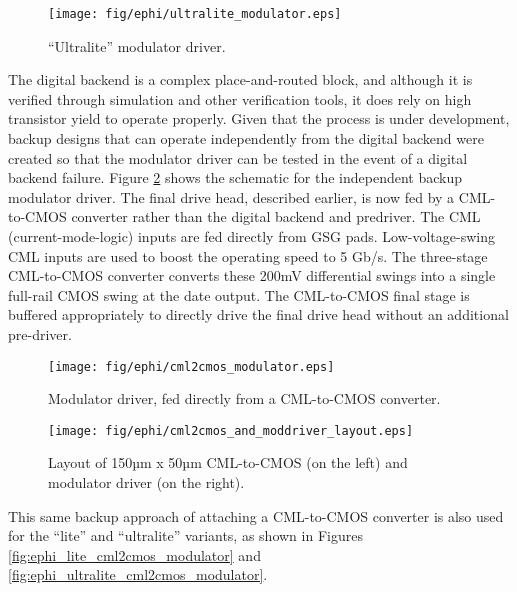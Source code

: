 	\begin{figure}[ht]
		\begin{center}
			\texttt{[image: fig/ephi/ultralite\_modulator.eps]}
			\caption{\label{fig:ephi_ultralite_modulator}``Ultralite'' modulator driver.}
		\end{center}
	\end{figure}

 
The digital backend is a complex place-and-routed block, and although it is verified through simulation and other verification tools, it does rely on high transistor yield to operate properly.  Given that the process is under development, backup designs that can operate independently from the digital backend were created so that the modulator driver can be tested in the event of a digital backend failure.
Figure \ref{fig:cml2cmos_modulator} shows the schematic for the independent backup modulator driver.  The final drive head, described earlier, is now fed by a CML-to-CMOS converter rather than the digital backend and predriver.  The CML (current-mode-logic) inputs are fed directly from GSG pads.  Low-voltage-swing CML inputs are used to boost the operating speed to 5 Gb/s.  The three-stage CML-to-CMOS converter converts these 200mV differential swings into a single full-rail CMOS swing at the date output.  The CML-to-CMOS final stage is buffered appropriately to directly drive the final drive head without an additional pre-driver.
 
	\begin{figure}[ht]
		\begin{center}
			\texttt{[image: fig/ephi/cml2cmos\_modulator.eps]}
			\caption{\label{fig:cml2cmos_modulator}Modulator driver, fed directly from a CML-to-CMOS converter.}
		\end{center}
	\end{figure}


 
	\begin{figure}[ht]
		\begin{center}
			\texttt{[image: fig/ephi/cml2cmos\_and\_moddriver\_layout.eps]}
			\caption{\label{fig:cml2cmos_and_moddriver_layout}Layout of 150µm x 50µm  CML-to-CMOS (on the left) and modulator driver (on the right).}
		\end{center}
	\end{figure}



This same backup approach of attaching a CML-to-CMOS converter is also used for the ``lite'' and ``ultralite'' variants, as shown in Figures \ref{fig:ephi_lite_cml2cmos_modulator} and \ref{fig:ephi_ultralite_cml2cmos_modulator}. 

